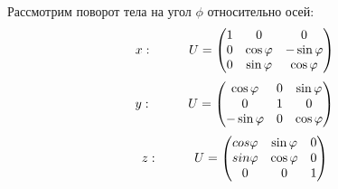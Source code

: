 Рассмотрим поворот тела на угол $\phi$ относительно осей:
\hypertarget{turns}{}
\[
x: \hspace*{1cm} U = \begin{pmatrix}
    1 & 0 & 0\\
    0 & \cos{\ensuremath{\varphi}} & -\sin{\ensuremath{\varphi}}\\
    0 & \sin{\ensuremath{\varphi}} & \cos{\ensuremath{\varphi}}\\
\end{pmatrix}
\]
\[
y: \hspace*{1cm} U = \begin{pmatrix}
    \cos{\ensuremath{\varphi}} & 0 & \sin{\ensuremath{\varphi}}\\
    0 & 1 & 0\\
    -\sin{\ensuremath{\varphi}} & 0 & \cos{\ensuremath{\varphi}}\\
\end{pmatrix}
\]
\[
z: \hspace*{1cm} U = \begin{pmatrix}
    cos{\varphi} & \sin{\ensuremath{\varphi}} & 0\\
    sin{\varphi} & \cos{\ensuremath{\varphi}} & 0\\
    0 & 0 & 1\\
\end{pmatrix}
\]

